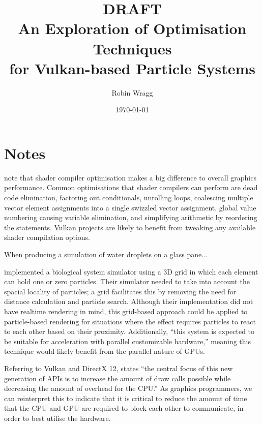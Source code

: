 \documentclass[11pt, a4paper, twocolumn]{article}
\title{\sffamily\bfseries DRAFT\\An Exploration of Optimisation Techniques\\for Vulkan-based Particle Systems}
\author{Robin Wragg}
\date{\today}
\begin{document}
\maketitle




\section{Notes}
\citet{Crawford2018} note that shader compiler optimisation makes a big difference to overall graphics performance. Common optimisations that shader compilers can perform are dead code elimination, factoring out conditionals, unrolling loops, coalescing multiple vector element assignments into a single swizzled vector assignment, global value numbering causing variable elimination, and simplifying arithmetic by reordering the statements. Vulkan projects are likely to benefit from tweaking any available shader compilation options.

When producing a simulation of water droplets on a glass pane... \citet{Chen2012}

\citet{Boulianne2007} implemented a biological system simulator using a 3D grid in which each element can hold one or zero particles. Their simulator needed to take into account the spacial locality of particles; a grid facilitates this by removing the need for distance calculation and particle search. Although their implementation did not have realtime rendering in mind, this grid-based approach could be applied to particle-based rendering for situations where the effect requires particles to react to each other based on their proximity. Additionally, ``this system is expected to be suitable for acceleration with parallel customizable hardware,'' \citep{Boulianne2007} meaning this technique would likely benefit from the parallel nature of GPUs.



Referring to Vulkan and DirectX 12, \citet{Joseph2016} states ``the central focus of this new generation of APIs is to increase the amount of draw calls possible while decreasing the amount of overhead for the CPU.'' As graphics programmers, we can reinterpret this to indicate that it is critical to reduce the amount of time that the CPU and GPU are required to block each other to communicate, in order to best utilise the hardware.
\end{document}
